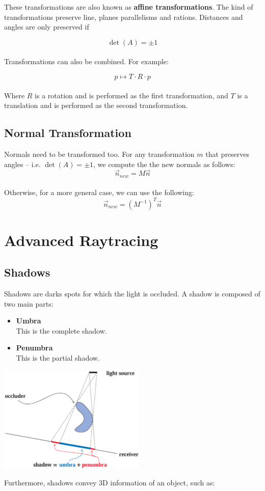 \documentclass{article}
\begin{document}
These transformations are also known as \textbf{affine transformations}. The kind of transformations preserve line, planes parallelisms and rations. Distances and angles are only preserved if

\[ \det(A) = \pm 1 \] \\
Transformations can also be combined. For example:

\[ p \mapsto T \cdot R \cdot p \] \\
Where $R$ is a rotation and is performed as the first transformation, and $T$ is a translation and is performed as the second transformation.

\subsection{Normal Transformation}
Normals need to be transformed too. For any transformation $m$ that preserves angles -- i.e. $\det(A) = \pm 1$, we compute the the new normals as follows:
\[ \overrightarrow{n}_{new} = M\overrightarrow{n} \] \\
Otherwise, for a more general case, we can use the following:
\[ \overrightarrow{n}_{new} = (M^{-1})^T\overrightarrow{n} \]

\section{Advanced Raytracing}
\subsection{Shadows}
Shadows are darks spots for which the light is occluded. A shadow is composed of two main parts:

\begin{itemize}
	\item \textbf{Umbra}
	\vspace{.2cm} \\
	This is the complete shadow.
	
	\item \textbf{Penumbra}
	\vspace{.2cm} \\
	This is the partial shadow.
\end{itemize}
\vspace{0cm}

\begin{center}
	\includegraphics[width=7cm]{shadow.png}
\end{center}
\vspace{.3cm}
Furthermore, shadows convey 3D information of an object, such as:
\end{document}
